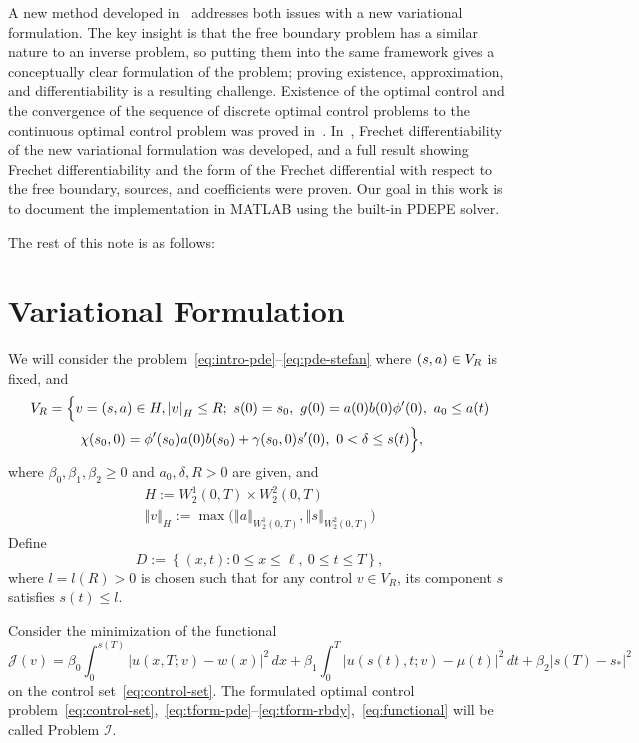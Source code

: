 \documentclass[letterpaper, 10pt]{amsart}
\theoremstyle{definition}
\theoremstyle{remark}
\newcommand{\bk}[1]{\left\{#1\right\}}
\newcommand{\norm}[1]{\left\Vert #1\right\Vert}%
\newcommand{\lnorm}[1]{\left\vert #1\right\vert}%
\begin{document}
A new method developed in~\cite{abdulla13,abdulla15} addresses both issues with a new variational formulation.
The key insight is that the free boundary problem has a similar nature to an inverse problem, so putting them into the same framework gives a conceptually clear formulation of the problem; proving existence, approximation, and differentiability is a resulting challenge.
Existence of the optimal control and the convergence of the sequence of discrete
optimal control problems to the continuous optimal control problem was proved
in~\cite{abdulla13,abdulla15}.
In~\cite{abdulla16,abdulla17}, Frechet differentiability of the new variational
formulation was developed, and a full result showing Frechet differentiability
and the form of the Frechet differential
with respect to the free boundary, sources, and coefficients were proven.
Our goal in this work is to document the implementation in MATLAB using the built-in PDEPE solver.

The rest of this note is as follows:

\section{Variational Formulation}\label{sec:variational-formulation}
We will consider the problem~\eqref{eq:intro-pde}--\eqref{eq:pde-stefan} where $(s, a{}) \in V_R$ is fixed, and
\begin{align}
  V_R & =\Big\{
        v=(\controlvars{}) \in H, \lnorm{v}_H \leq R;
        ~s(0) = s_0,
        ~g(0) = a(0)b(0) \phi'(0),
        ~a_0 \leq a(t)\nonumber
  \\
      & \qquad
        ~\chi(s_{0},0) = \phi'(s_{0})a(0)b(s_0) + \gamma(s_0, 0)s'(0),
        ~0 < \delta \leq s(t)
        \Big\},\label{eq:control-set}
\end{align}
where $\beta_0, \beta_1, \beta_2 \geq 0$ and $a_0, \delta, R > 0$ are given, and
\def\acontrolspace{W_2^1}
\def\scontrolspace{W_2^2}
\begin{gather*}
  H := \acontrolspace(0,T)
  \times \scontrolspace(0,T)
    \\
    \norm{v}_H := \max\Big(
    \norm{a}_{\acontrolspace(0,T)},
    \norm{s}_{\scontrolspace(0,T)}
    \Big)
  \end{gather*}
  Define
  \let\l\ell%
\[
  D := \bk{(x,t) : 0\leq x\leq \l,~ 0\leq t\leq T},
\]
where $l = l(R) > 0$ is chosen such that for any control $v\in V_R$, its component
$s$ satisfies $s(t)\leq l$.

Consider the minimization of the functional
\def\J{\mathcal{J}}
\begin{equation}
  \J(v)
  = \beta_0 \int_0^{s(T)} \lnorm{u(x, T; v) - w(x)}^2\,dx
  + \beta_1 \int_0^T \lnorm{u(s(t), t; v) - \mu(t)}^2\,dt
  + \beta_2 \lnorm{s(T) - s_*}^2\label{eq:functional}
\end{equation}
on the control set~\eqref{eq:control-set}.
\def\I{\mathcal{I}}
The formulated optimal control problem~\eqref{eq:control-set},~\eqref{eq:tform-pde}--\eqref{eq:tform-rbdy},~\eqref{eq:functional} will be called Problem $\I$.
\end{document}
